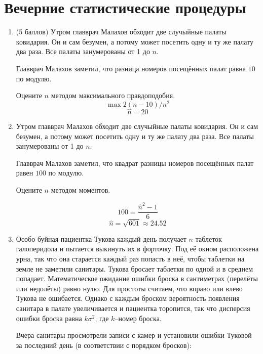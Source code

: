 \documentclass[12pt]{article}
\newenvironment{solution}{}{}
\begin{document}
\newpage
\section*{Вечерние статистические процедуры}

\begin{enumerate}

    \item (5 баллов) Утром главврач Малахов обходит две случыйные палаты ковидария.
Он и сам безумен, а потому может посетить одну и ту же палату два раза. Все палаты занумерованы от 1 до $n$.  
    
    Главврач Малахов заметил, что разница номеров посещённых палат равна $10$ по модулю.
    
    Оцените $n$ методом максимального правдоподобия.
\begin{solution}
    \[
    \max 2(n-10) / n^2 
    \]
    \[
    \hat n = 20
    \]
\end{solution}
    
    
    \item Утром главврач Малахов обходит две случыйные палаты ковидария.
Он и сам безумен, а потому может посетить одну и ту же палату два раза. Все палаты занумерованы от 1 до $n$.  
    
    Главврач Малахов заметил, что квадрат разницы номеров посещённых палат равен $100$ по модулю.
    
    Оцените $n$ методом моментов.
    
\begin{solution}
    \[
    100 = \frac{\hat n^2 - 1}{6}
    \]
    \[
    \hat n = \sqrt{601} \approx 24.52
    \]
\end{solution}


        \item
        
        Особо буйная пациентка Тукова каждый день получает $n$ таблеток галоперидола и пытается выкинуть их в форточку. Под её окном расположена урна, так что она старается каждый раз попасть в неё, чтобы таблетки на земле не заметили санитары. Тукова бросает таблетки по одной и в среднем попадает. Математическое ожидание ошибки броска в сантиметрах (перелёты или недолёты) равно нулю. Для простоты считаем, что вправо или влево Тукова не ошибается. Однако с каждым броском вероятность появления санитара в палате увеличивается и пациентка торопится, так что дисперсия ошибки броска равна $k \sigma^2$, где $k$--номер броска.
        
        Вчера санитары просмотрели записи с камер и установили ошибки Туковой за последний день (в соответствии с порядком бросков):
        

\end{enumerate}
\end{document}
